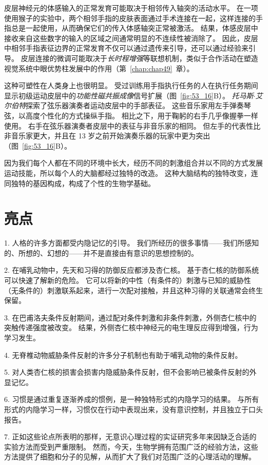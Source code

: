皮层神经元的体感输入的正常发育可能取决于相邻传入轴突的活动水平。
在一项使用猴子的实验中，两个相邻手指的皮肤表面通过手术连接在一起，这样连接的手指总是一起使用，从而确保它们的传入体感轴突正常被激活。
结果，体感皮层中接收来自这些数字的输入的区域之间通常明显的不连续性被消除了。
因此，皮层中相邻手指表征边界的正常发育不仅可以通过遗传来引导，还可以通过经验来引导。
皮层连接的微调可能取决于\textit{长时程增强}等联想机制，类似于合作活动在塑造视觉系统中眼优势柱发展中的作用（第~\ref{chap:chap49}~章）。


这种可塑性在人类身上也很明显。
受过训练用手指执行任务的人在执行任务期间显示初级运动皮层中的\textit{功能性磁共振成像}信号扩展（图~\ref{fig:53_16}B）。
\textit{托马斯$\cdot$艾尔伯特}探索了弦乐器演奏者运动皮层中的手部表征。
这些音乐家用左手弹奏琴弦，以高度个性化的方式操纵手指。
相比之下，用于鞠躬的右手几乎像握拳一样使用。
右手在弦乐器演奏者皮层中的表征与非音乐家的相同。
但左手的代表性比非音乐家更大，并且在 13 岁之前开始演奏乐器的玩家中更为突出（图~\ref{fig:53_16}B）。


因为我们每个人都在不同的环境中长大，经历不同的刺激组合并以不同的方式发展运动技能，所以每个人的大脑都经过独特的改造。
这种大脑结构的独特改变，连同独特的基因构成，构成了个性的生物学基础。



\section{亮点}

1. 人格的许多方面都受内隐记忆的引导。
我们所经历的很多事情——我们所感知的、所想的、幻想的——并不是直接由有意识的思想控制的。


2. 在哺乳动物中，先天和习得的防御反应都涉及杏仁核。
基于杏仁核的防御系统可以快速了解新的危险。
它可以将新的中性（有条件的）刺激与已知的威胁性（无条件的）刺激联系起来，进行一次配对接触，并且这种习得的关联通常会终生保留。


3. 在巴甫洛夫条件反射期间，通过配对条件刺激和非条件刺激，外侧杏仁核中的突触传递强度被改变。
结果，外侧杏仁核中神经元的电生理反应得到增强，行为学习发生。


4. 无脊椎动物威胁条件反射的许多分子机制也有助于哺乳动物的条件反射。


5. 对人类杏仁核的损害会损害内隐威胁条件反射，但不会影响已被条件反射的外显记忆。


6. 习惯是通过重复逐渐养成的惯例，是一种独特形式的内隐学习的结果。
与所有形式的内隐学习一样，习惯仅在行动中表现出来，没有意识控制，并且独立于口头报告。


7. 正如这些论点所表明的那样，无意识心理过程的实证研究多年来因缺乏合适的实验方法而受到严重限制。
然而，今天，生物学拥有范围广泛的经验方法，这些方法提供了细胞和分子的见解，从而扩大了我们对范围广泛的心理活动的理解。


